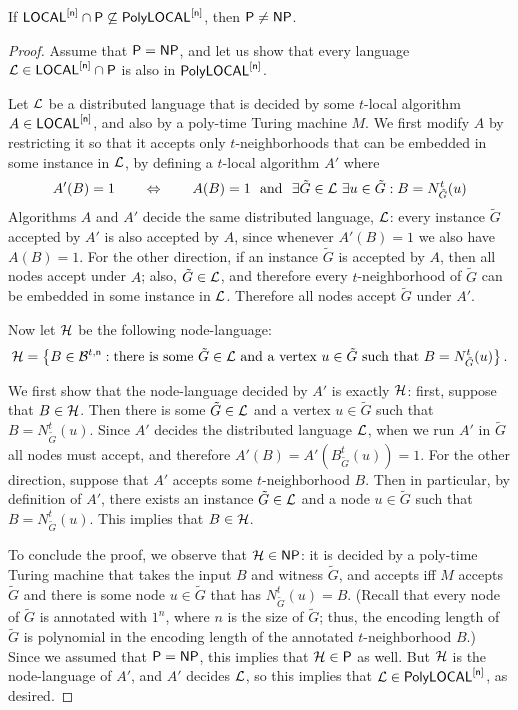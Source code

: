 \begin{theorem}
	If ${\mathsf{LOCAL}}^{[\mathsf{n}]} \cap {\mathsf{P}} \not \subseteq \mathsf{PolyLOCAL}^{[\mathsf{n}]}$, then ${\mathsf{P}} \neq {\mathsf{NP}}$.
	\label{thm:sep_obstacle}
\end{theorem}
\begin{proof}
	Assume that ${\mathsf{P}} = {\mathsf{NP}}$, and let us show that every language $\mathcal{L} \in {\mathsf{LOCAL}}^{[\mathsf{n}]} \cap {\mathsf{P}}$ is also in $\mathsf{PolyLOCAL}^{[\mathsf{n}]}$.

	Let $\mathcal{L}$ be a distributed language that is decided by some $t$-local algorithm $A \in {\mathsf{LOCAL}}^{[\mathsf{n}]}$, 
	and also by a poly-time Turing machine $M$.
	We first modify $A$ by restricting it so that it accepts only $t$-neighborhoods that can be embedded in some instance in $\mathcal{L}$, by defining a $t$-local algorithm $A'$ where
	\begin{equation*}
		A'(B) = 1 \qquad \Leftrightarrow \qquad  A(B) = 1\ \text{ and }\ \exists \tilde{G} \in \mathcal{L}\ \exists u \in \tilde{G} : B = N_{\tilde{G}}^t(u)
	\end{equation*}
	Algorithms $A$ and $A'$ decide the same distributed language, $\mathcal{L}$:
	every instance $\tilde{G}$ accepted by $A'$ is also accepted by $A$, since 
	whenever $A'(B) = 1$ we also have $A(B) = 1$.
	For the other direction, if an instance $\tilde{G}$ is accepted by $A$, then
	all nodes accept under $A$; also,
	$\tilde{G} \in \mathcal{L}$,
	and therefore every $t$-neighborhood of $\tilde{G}$ can be embedded in some instance in $\mathcal{L}$.
	Therefore all nodes accept $\tilde{G}$ under $A'$.
	
	Now let $\mathcal{H}$ be the following node-language:
	\begin{equation*}
		\mathcal{H} = \left \{{ B \in \mathcal{B}^{t,\mathsf{n}} : \text{there is some $\tilde{G} \in \mathcal{L}$ and a vertex $u \in \tilde{G}$
		such that $B = N^t_{\tilde{G}}(u)$} } \right \}.
	\end{equation*}
 
	We first show that the node-language decided by $A'$ is exactly $\mathcal{H}$:
	first, suppose that $B \in \mathcal{H}$. Then there is some $\tilde{G} \in \mathcal{L}$ and a vertex $u \in \tilde{G}$
	such that $B = N^t_{\tilde{G}}(u)$.
	Since $A'$ decides the distributed language $\mathcal{L}$, when we run $A'$ in $\tilde{G}$ all nodes must accept,
	and therefore $A'(B) = A'(B_{\tilde{G}}^t(u)) = 1$.
	For the other direction, suppose that $A'$ accepts some $t$-neighborhood $B$.
	Then in particular, by definition of $A'$,
	there exists an instance $\tilde{G} \in \mathcal{L}$ and a node $u \in \tilde{G}$ such that 
	$B = N_{\tilde{G}}^t(u)$.
	This implies that $B \in \mathcal{H}$.

	To conclude the proof, we observe that $\mathcal{H} \in {\mathsf{NP}}$:
	it is decided by a poly-time Turing machine that takes the input $B$ and witness $\tilde{G}$,
	and accepts iff $M$ accepts $\tilde{G}$ and there is some node $u \in \tilde{G}$ that has 
	$N_{\tilde{G}}^t(u) = B$.
	(Recall that every node of $\tilde{G}$ is annotated with $1^n$, where $n$ is the size of $\tilde{G}$;
	thus, the encoding length of $\tilde{G}$ is polynomial in the encoding length of the annotated $t$-neighborhood $B$.)
	Since we assumed that ${\mathsf{P}} = {\mathsf{NP}}$, this implies that $\mathcal{H} \in {\mathsf{P}}$ as well.
	But $\mathcal{H}$ is the node-language of $A'$, and $A'$ decides $\mathcal{L}$, so this implies that 
	$\mathcal{L} \in \mathsf{PolyLOCAL}^{[\mathsf{n}]}$, as desired.


\end{proof}

